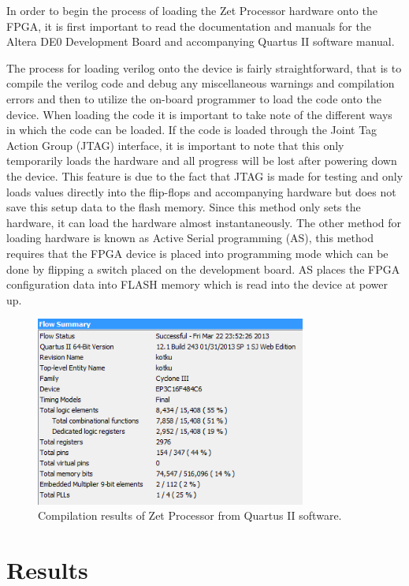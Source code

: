 \documentclass[11pt,peerreviewca]{IEEEtran}
\begin{document}
In order to begin the process of loading the Zet Processor hardware onto the FPGA, it is first important to read the documentation and manuals for the Altera DE0 Development Board and accompanying Quartus II software manual. 

The process for loading verilog onto the device is fairly straightforward, that is to compile the verilog code and debug any miscellaneous warnings and compilation errors and then to utilize the on-board programmer to load the code onto the device. When loading the code it is important to take note of the different ways in which the code can be loaded. If the code is loaded through the Joint Tag Action Group (JTAG) interface, it is important to note that this only temporarily loads the hardware and all progress will be lost after powering down the device. This feature is due to the fact that JTAG is made for testing and only loads values directly into the flip-flops and accompanying hardware but does not save this setup data to the flash memory. Since this method only sets the hardware, it can load the hardware almost instantaneously. The other method for loading hardware is known as Active Serial programming (AS), this method requires that the FPGA device is placed into programming mode which can be done by flipping a switch placed on the development board. AS places the FPGA configuration data into FLASH memory which is read into the device at power up. 

\begin{figure}[!h]
\centering
\includegraphics[width=3.5in]{CompileResults}
\caption{Compilation results of Zet Processor from Quartus II software.}
\label{fig:CompileResults}
\end{figure}

\section{Results}
\end{document}
